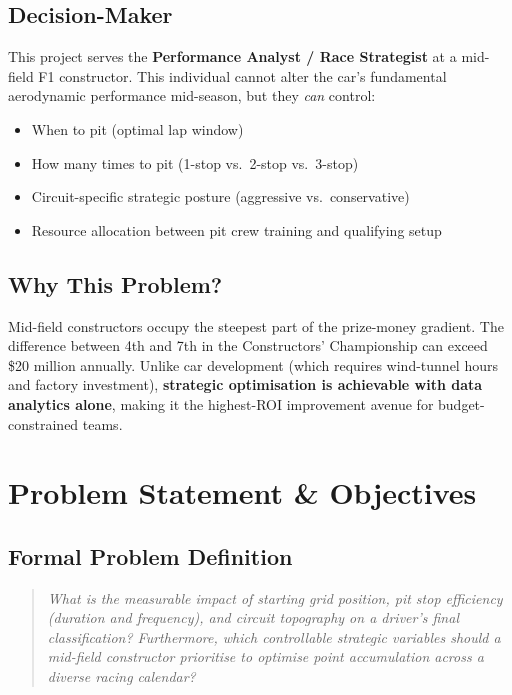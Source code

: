 \documentclass[12pt, a4paper]{article}
\begin{document}
\subsection{Decision-Maker}
This project serves the \textbf{Performance Analyst / Race Strategist} at a mid-field F1 constructor. This individual cannot alter the car's fundamental aerodynamic performance mid-season, but they \textit{can} control:
\begin{itemize}
    \item When to pit (optimal lap window)
    \item How many times to pit (1-stop vs.\ 2-stop vs.\ 3-stop)
    \item Circuit-specific strategic posture (aggressive vs.\ conservative)
    \item Resource allocation between pit crew training and qualifying setup
\end{itemize}

\subsection{Why This Problem?}
Mid-field constructors occupy the steepest part of the prize-money gradient. The difference between 4th and 7th in the Constructors' Championship can exceed \$20 million annually. Unlike car development (which requires wind-tunnel hours and factory investment), \textbf{strategic optimisation is achievable with data analytics alone}, making it the highest-ROI improvement avenue for budget-constrained teams.

\newpage

\section{Problem Statement \& Objectives}

\subsection{Formal Problem Definition}
\begin{quote}
\textit{What is the measurable impact of starting grid position, pit stop efficiency (duration and frequency), and circuit topography on a driver's final classification? Furthermore, which controllable strategic variables should a mid-field constructor prioritise to optimise point accumulation across a diverse racing calendar?}
\end{quote}
\end{document}
